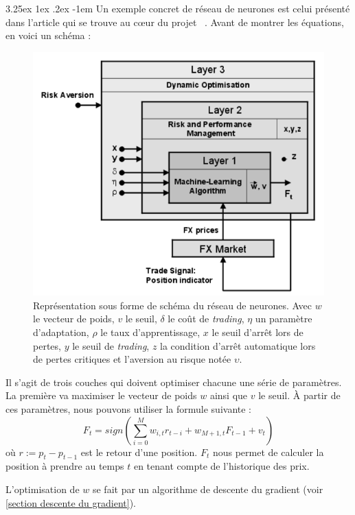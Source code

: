 \documentclass[a4paper, 11pt]{article}
\makeatletter
\renewcommand\paragraph{\@startsection{paragraph}{5}{\z@}%
  {3.25ex \@plus1ex \@minus.2ex}%
  {-1em}%
  {\normalfont\normalsize\bfseries}}
\makeatother
\begin{document}
\paragraph{}
Un exemple concret de réseau de neurones est celui présenté dans l'article qui se trouve au cœur du projet ~\cite{fx_trading}.
Avant de montrer les équations, en voici un schéma \cite{fx_trading}:
\begin{figure}[H]
 \centering
 \includegraphics[scale=0.4]{images/exemple_nn_projet}
 \caption{Représentation sous forme de schéma du réseau de neurones. Avec $w$ le vecteur de poids, $v$ le seuil, $\delta$ le coût de
 \textit{trading}, $\eta$ un paramètre d'adaptation, $\rho$ le taux d'apprentissage, $x$ le seuil d'arrêt lors de pertes, $y$ le
 seuil de \textit{trading}, $z$ la condition d'arrêt automatique lors de pertes critiques et l'aversion au risque notée $\upsilon$.}
\end{figure}

Il s'agit de trois couches qui doivent optimiser chacune une série de paramètres. La première va maximiser le vecteur de poids $w$
ainsi que $v$ le seuil. À partir de ces paramètres, nous pouvons utiliser la formule suivante :
$$F_t = sign(\sum_{i=0}^M w_{i,t} r_{t-i} + w_{M+1,t} F_{t-1} + v_t)$$
où $r := p_t - p_{t-1}$ est le retour d'une position. $F_t$ nous permet de calculer la position à prendre au temps $t$ en tenant
compte de l'historique des prix.

L'optimisation de $w$ se fait par un algorithme de descente du gradient (voir \ref{section descente du gradient}).
\end{document}
